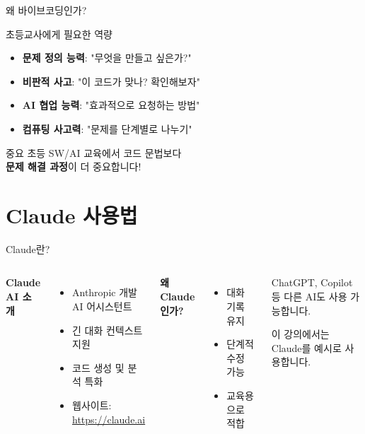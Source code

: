 \documentclass[aspectratio=169]{beamer}
\begin{document}
\begin{frame}{왜 바이브코딩인가?}
  \begin{block}{초등교사에게 필요한 역량}
    \begin{itemize}
      \item \textbf{문제 정의 능력}: "무엇을 만들고 싶은가?"
      \item \textbf{비판적 사고}: "이 코드가 맞나? 확인해보자"
      \item \textbf{AI 협업 능력}: "효과적으로 요청하는 방법"
      \item \textbf{컴퓨팅 사고력}: "문제를 단계별로 나누기"
    \end{itemize}
  \end{block}
  
  \vspace{0.5em}
  
  \begin{alertblock}{중요}
    초등 SW/AI 교육에서 코드 문법보다 \\
    \textbf{문제 해결 과정}이 더 중요합니다!
  \end{alertblock}
\end{frame}

\section{Claude 사용법}

\begin{frame}{Claude란?}
  \begin{columns}
    \textbf{Claude AI 소개}
    \begin{itemize}
      \item Anthropic 개발 AI 어시스턴트
      \item 긴 대화 컨텍스트 지원
      \item 코드 생성 및 분석 특화
      \item 웹사이트: \url{https://claude.ai}
    \end{itemize}
    
    \vspace{1em}
    \textbf{왜 Claude인가?}
    \begin{itemize}
      \item 대화 기록 유지
      \item 단계적 수정 가능
      \item 교육용으로 적합
    \end{itemize}
    
    \begin{tcolorbox}[title=ℹ️ 참고]
      ChatGPT, Copilot 등 다른 AI도 사용 가능합니다.
      
      \vspace{0.5em}
      
      이 강의에서는 Claude를 예시로 사용합니다.
    \end{tcolorbox}
  \end{columns}
\end{frame}
\end{document}
